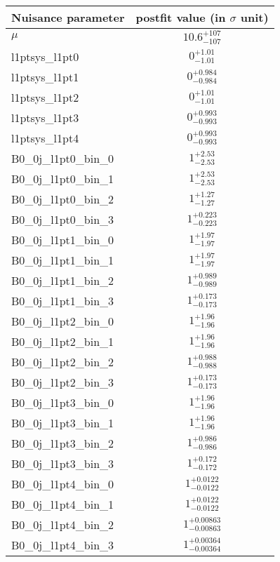 
\begin{tabular}{|l|c|}
\hline
Nuisance parameter & postfit value (in $\sigma$ unit) \\\hline
$\mu$ & $10.6^{+107}_{-107}$ \\
l1ptsys\_l1pt0 & $0^{+1.01}_{-1.01}$ \\
l1ptsys\_l1pt1 & $0^{+0.984}_{-0.984}$ \\
l1ptsys\_l1pt2 & $0^{+1.01}_{-1.01}$ \\
l1ptsys\_l1pt3 & $0^{+0.993}_{-0.993}$ \\
l1ptsys\_l1pt4 & $0^{+0.993}_{-0.993}$ \\
B0\_0j\_l1pt0\_bin\_0 & $1^{+2.53}_{-2.53}$ \\
B0\_0j\_l1pt0\_bin\_1 & $1^{+2.53}_{-2.53}$ \\
B0\_0j\_l1pt0\_bin\_2 & $1^{+1.27}_{-1.27}$ \\
B0\_0j\_l1pt0\_bin\_3 & $1^{+0.223}_{-0.223}$ \\
B0\_0j\_l1pt1\_bin\_0 & $1^{+1.97}_{-1.97}$ \\
B0\_0j\_l1pt1\_bin\_1 & $1^{+1.97}_{-1.97}$ \\
B0\_0j\_l1pt1\_bin\_2 & $1^{+0.989}_{-0.989}$ \\
B0\_0j\_l1pt1\_bin\_3 & $1^{+0.173}_{-0.173}$ \\
B0\_0j\_l1pt2\_bin\_0 & $1^{+1.96}_{-1.96}$ \\
B0\_0j\_l1pt2\_bin\_1 & $1^{+1.96}_{-1.96}$ \\
B0\_0j\_l1pt2\_bin\_2 & $1^{+0.988}_{-0.988}$ \\
B0\_0j\_l1pt2\_bin\_3 & $1^{+0.173}_{-0.173}$ \\
B0\_0j\_l1pt3\_bin\_0 & $1^{+1.96}_{-1.96}$ \\
B0\_0j\_l1pt3\_bin\_1 & $1^{+1.96}_{-1.96}$ \\
B0\_0j\_l1pt3\_bin\_2 & $1^{+0.986}_{-0.986}$ \\
B0\_0j\_l1pt3\_bin\_3 & $1^{+0.172}_{-0.172}$ \\
B0\_0j\_l1pt4\_bin\_0 & $1^{+0.0122}_{-0.0122}$ \\
B0\_0j\_l1pt4\_bin\_1 & $1^{+0.0122}_{-0.0122}$ \\
B0\_0j\_l1pt4\_bin\_2 & $1^{+0.00863}_{-0.00863}$ \\
B0\_0j\_l1pt4\_bin\_3 & $1^{+0.00364}_{-0.00364}$ \\
\hline
\end{tabular}

